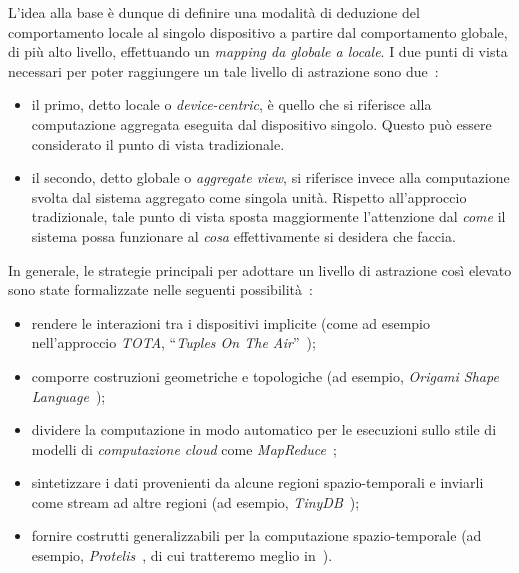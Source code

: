 L'idea alla base è dunque di definire una modalità di deduzione del comportamento locale al singolo dispositivo a partire dal comportamento globale, di più alto livello,
effettuando un \emph{mapping da globale a locale}.
I due punti di vista necessari per poter raggiungere un tale livello di astrazione sono due~\cite{aggregatescala-pmldc2016}:

\begin{itemize}
    \item
        il primo, detto locale o \emph{device-centric}, è quello che si riferisce alla computazione aggregata eseguita dal dispositivo singolo.
        Questo può essere considerato il punto di vista tradizionale.

    \item
        il secondo, detto globale o \emph{aggregate view}, si riferisce invece alla computazione svolta dal sistema aggregato come singola unità.
        Rispetto all'approccio tradizionale, tale punto di vista sposta maggiormente l'attenzione dal \emph{come} il sistema possa funzionare
        al \emph{cosa} effettivamente si desidera che faccia.

\end{itemize}

In generale, le strategie principali per adottare un livello di astrazione così elevato sono state formalizzate nelle seguenti possibilità~\cite{7274429}:

\begin{itemize}
  \item rendere le interazioni tra i dispositivi implicite (come ad esempio nell'approccio \emph{TOTA}, ``\emph{Tuples On The Air}''~\cite{10.1145/1538942.1538945});
  \item comporre costruzioni geometriche e topologiche (ad esempio, \emph{Origami Shape Language}~\cite{nagpal2001programmable});
  \item dividere la computazione in modo automatico per le esecuzioni sullo stile di modelli di \emph{computazione cloud} come \emph{MapReduce}~\cite{10.1145/1327452.1327492};
  \item sintetizzare i dati provenienti da alcune regioni spazio-temporali e inviarli come stream ad altre regioni (ad esempio, \emph{TinyDB}~\cite{1017485});
  \item fornire costrutti generalizzabili per la computazione spazio-temporale (ad esempio, \emph{Protelis}~\cite{PianiniSASOTutorial2017}, di cui tratteremo meglio in~).
\end{itemize}

